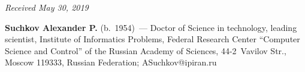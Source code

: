 \vspace*{-7pt}

\hfill{\small\textit{Received May 30, 2019}}


\vspace*{-22pt}

\Contrl


\noindent
\textbf{Suchkov Alexander P.} (b.\ 1954)~--- Doctor of Science in technology, 
leading scientist, Institute of Informatics Problems, Federal Research Center 
``Computer Science and Control'' of the Russian Academy of Sciences,  
44-2~Vavilov Str., Moscow 119333, Russian Federation; 
\mbox{ASuchkov@ipiran.ru}
\label{end\stat}

\renewcommand{\bibname}{\protect\rm Литература}  
      
      